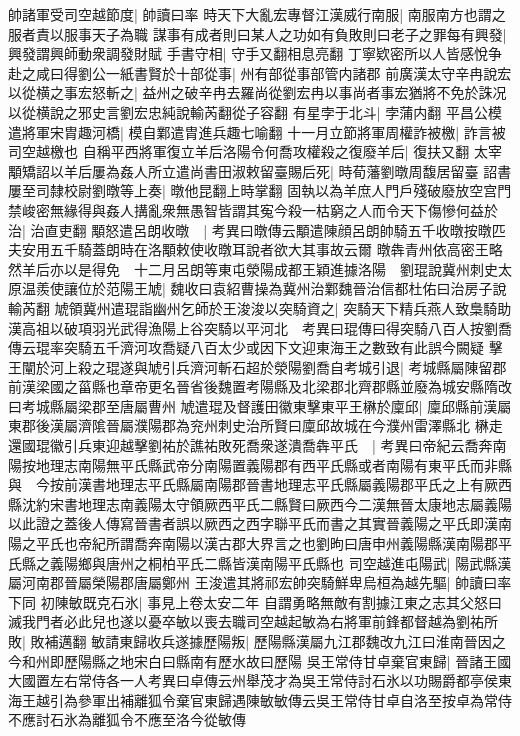 帥諸軍受司空越節度|{
	帥讀曰率}
時天下大亂宏專督江漢威行南服|{
	南服南方也謂之服者責以服事天子為職}
謀事有成者則曰某人之功如有負敗則曰老子之罪每有興發|{
	興發謂興師動衆調發財賦}
手書守相|{
	守手又翻相息亮翻}
丁寧欵密所以人皆感悅争赴之咸曰得劉公一紙書賢於十部從事|{
	州有部從事部管内諸郡}
前廣漢太守辛冉說宏以從横之事宏怒斬之|{
	益州之破辛冉去羅尚從劉宏冉以事尚者事宏猶將不免於誅况以從横說之邪史言劉宏忠純說輸芮翻從子容翻}
有星孛于北斗|{
	孛蒲内翻}
平昌公模遣將軍宋胄趣河橋|{
	模自鄴遣胄進兵趣七喻翻}
十一月立節將軍周權詐被檄|{
	詐言被司空越檄也}
自稱平西將軍復立羊后洛陽令何喬攻權殺之復廢羊后|{
	復扶又翻}
太宰顒矯詔以羊后屢為姦人所立遣尚書田淑敕留臺賜后死|{
	時荀藩劉暾周馥居留臺}
詔書屢至司隸校尉劉暾等上奏|{
	暾他昆翻上時掌翻}
固執以為羊庶人門戶殘破廢放空宫門禁峻密無緣得與姦人搆亂衆無愚智皆謂其寃今殺一枯窮之人而令天下傷慘何益於治|{
	治直吏翻}
顒怒遣呂朗收暾　|{
	考異曰暾傳云顒遣陳顔呂朗帥騎五千收暾按暾匹夫安用五千騎蓋朗時在洛顒敕使收暾耳說者欲大其事故云爾}
暾犇青州依高密王略然羊后亦以是得免　十二月呂朗等東屯滎陽成都王穎進據洛陽　劉琨說冀州刺史太原温羨使讓位於范陽王虓|{
	魏收曰袁紹曹操為冀州治鄴魏晉治信都杜佑曰治房子說輸芮翻}
虓領冀州遣琨詣幽州乞師於王浚浚以突騎資之|{
	突騎天下精兵燕人致梟騎助漢高祖以破項羽光武得漁陽上谷突騎以平河北　考異曰琨傳曰得突騎八百人按劉喬傳云琨率突騎五千濟河攻喬疑八百太少或因下文迎東海王之數致有此誤今闕疑}
擊王闡於河上殺之琨遂與虓引兵濟河斬石超於滎陽劉喬自考城引退|{
	考城縣屬陳留郡前漢梁國之菑縣也章帝更名晉省後魏置考陽縣及北梁郡北齊郡縣並廢為城安縣隋改曰考城縣屬梁郡至唐屬曹州}
虓遣琨及督護田徽東擊東平王楙於廩邱|{
	廩邱縣前漢屬東郡後漢屬濟隂晉屬濮陽郡為兖州刺史治所賢曰廩邱故城在今濮州雷澤縣北}
楙走還國琨徽引兵東迎越擊劉祐於譙祐敗死喬衆遂潰喬犇平氏　|{
	考異曰帝紀云喬奔南陽按地理志南陽無平氏縣武帝分南陽置義陽郡有西平氏縣或者南陽有東平氏而非縣與　今按前漢書地理志平氏縣屬南陽郡晉書地理志平氏縣屬義陽郡平氏之上有厥西縣沈約宋書地理志南義陽太守領厥西平氏二縣賢曰厥西今二漢無晉太康地志屬義陽以此證之蓋後人傳寫晉書者誤以厥西之西字聯平氏而書之其實晉義陽之平氏即漢南陽之平氏也帝紀所謂喬奔南陽以漢古郡大界言之也劉昫曰唐申州義陽縣漢南陽郡平氏縣之義陽鄉與唐州之桐柏平氏二縣皆漢南陽平氏縣也}
司空越進屯陽武|{
	陽武縣漢屬河南郡晉屬榮陽郡唐屬鄭州}
王浚遣其將祁宏帥突騎鮮卑烏桓為越先驅|{
	帥讀曰率下同}
初陳敏既克石氷|{
	事見上卷太安二年}
自謂勇略無敵有割據江東之志其父怒曰滅我門者必此兒也遂以憂卒敏以喪去職司空越起敏為右將軍前鋒都督越為劉祐所敗|{
	敗補邁翻}
敏請東歸收兵遂據歷陽叛|{
	歷陽縣漢屬九江郡魏改九江曰淮南晉因之今和州即歷陽縣之地宋白曰縣南有歷水故曰歷陽}
吳王常侍甘卓棄官東歸|{
	晉諸王國大國置左右常侍各一人考異曰卓傳云州舉茂才為吳王常侍討石氷以功賜爵都亭侯東海王越引為參軍出補離狐令棄官東歸遇陳敏敏傳云吳王常侍甘卓自洛至按卓為常侍不應討石氷為離狐令不應至洛今從敏傳}
